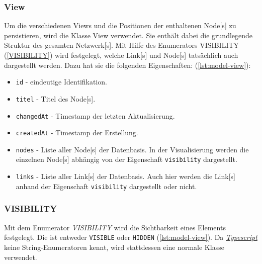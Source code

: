 \subsubsection{View}\label{view}
Um die verschiedenen \gls{View}s und die Positionen der enthaltenen \gls{Node}[s] zu persistieren, wird die Klasse \gls{View} verwendet. Sie enthält dabei die grundlegende Struktur des gesamten \gls{Netzwerk}[s]. Mit Hilfe des Enumerators VISIBILITY (\autoref{VISIBILITY}) wird festgelegt, welche \gls{Link}[s] und \gls{Node}[s] tatsächlich auch dargestellt werden. Dazu hat sie die folgenden Eigenschaften: (\autoref{lst:model-view}):

\begin{itemize}
  \item \texttt{id} - eindeutige Identifikation.
  \item \texttt{titel} - Titel des \gls{Node}[s].
  \item \texttt{changedAt} - Timestamp der letzten Aktualisierung.
  \item \texttt{createdAt} - Timestamp der Erstellung.
  \item \texttt{nodes} - Liste aller \gls{Node}[s] der Datenbasis. In der Visualisierung werden die einzelnen \gls{Node}[s] abhängig von der Eigenschaft \texttt{vi\-si\-bi\-li\-ty} dargestellt.
  \item \texttt{links} - Liste aller \gls{Link}[s] der Datenbasis. Auch hier werden die \gls{Link}[s] anhand der Eigenschaft \texttt{visibility} dargestellt oder nicht.
\end{itemize}


\subsubsection{VISIBILITY}\label{VISIBILITY}
Mit dem Enumerator \textit{VISIBILITY} wird die Sichtbarkeit eines Elements festgelegt. Die ist entweder \texttt{VISIBLE} oder \texttt{HIDDEN} (\autoref{lst:model-view}). Da \hyperref[typescript]{\textit{Typescript}} keine String-Enumeratoren kennt, wird stattdessen eine normale Klasse verwendet.



